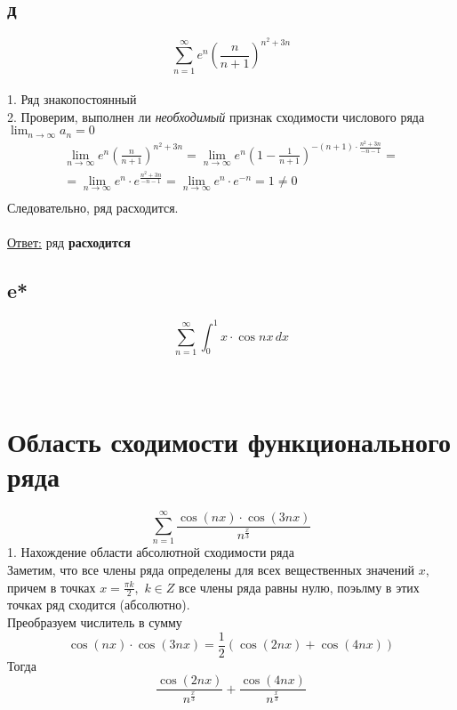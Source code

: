 \documentclass[a5paper, 10pt]{article}
\theoremstyle{definition}
\theoremstyle{plain}
\theoremstyle{remark}
\begin{document}
\subsection{д}
\begin{equation}
\sum \limits_{n = 1}^{\infty} e^n \left( \frac{n}{n+1} \right)^{n^2+3n}
\end{equation}
\\
1. Ряд знакопостоянный\\
2. Проверим, выполнен ли \textit{необходимый} признак сходимости числового ряда $ \lim_{n \to \infty} a_n = 0$
\begin{multline*}
\lim_{n \to \infty} e^n \left( \frac{n}{n+1} \right)^{n^2+3n} =
 \lim_{n \to \infty} e^n \left( 1-\frac{1}{n+1} \right)^{-(n+1) \cdot \frac{n^2+3n}{-n-1}} = \\ =
\lim_{n \to \infty} e^n\cdot e^{ \frac{n^2+3n}{-n-1}}  = \lim_{n \to \infty} e^n\cdot e^{-n} = 1 \neq 0 \\
\end{multline*}
Следовательно, ряд расходится.\\\\
\underline{Ответ:} ряд  \textbf{расходится}
\subsection{e*}
\begin{equation}
\sum \limits_{n = 1}^{\infty}\int_0^1 x \cdot \cos nx \, dx
\end{equation}
\\
\\
\section{Область сходимости функционального ряда}
\begin{equation}
\sum \limits_{n = 1}^{\infty}\frac{\cos( nx) \cdot \cos (3nx) }{n^{\frac{x}{3}}}
\end{equation}
1. Нахождение области абсолютной сходимости ряда\\
Заметим, что все члены ряда определены для всех вещественных значений $x$, причем в точках  $x=\frac{\pi k}{2}, \,\, k \in Z$ все члены ряда равны нулю, поэьлму в этих точках ряд сходится (абсолютно).\\
Преобразуем числитель в сумму
\begin{equation}
\cos( nx) \cdot \cos (3nx) = \frac{1}{2}\left( \cos(2nx) + \cos(4nx) \right)
\end{equation}
Тогда
\begin{equation}
\frac{\cos( 2nx) }{n^{\frac{x}{3}}}+\frac{ \cos (4nx) }{n^{\frac{x}{3}}}
\end{equation}
\end{document}
